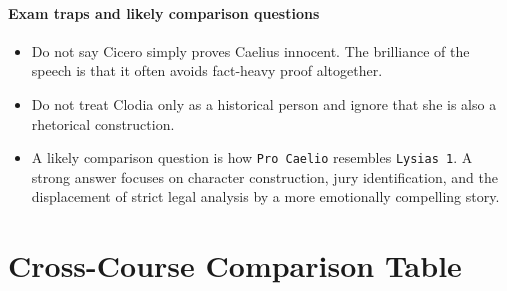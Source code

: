 \documentclass[11pt]{article}
\begin{document}
\paragraph{Exam traps and likely comparison questions}

\begin{itemize}
\item Do not say Cicero simply proves Caelius innocent. The brilliance of the speech is that it often avoids fact-heavy proof altogether.
\item Do not treat Clodia only as a historical person and ignore that she is also a rhetorical construction.
\item A likely comparison question is how \texttt{Pro Caelio} resembles \texttt{Lysias 1}. A strong answer focuses on character construction, jury identification, and the displacement of strict legal analysis by a more emotionally compelling story.
\end{itemize}

\section{Cross-Course Comparison Table}
\end{document}
